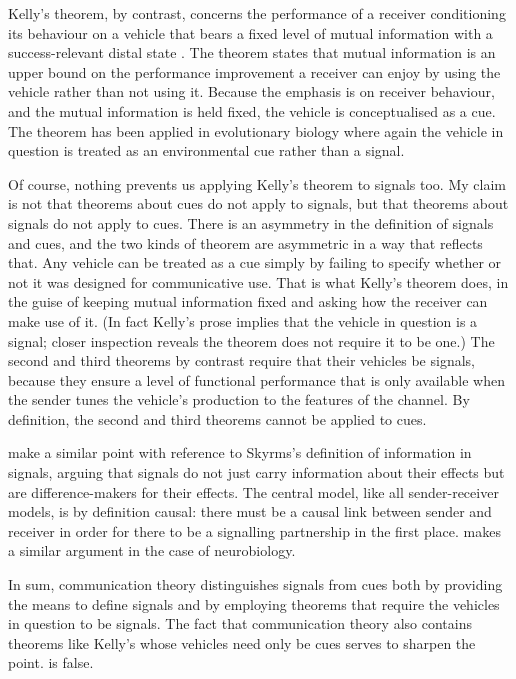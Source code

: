 \documentclass[12pt]{article}
\begin{document}
Kelly's theorem, by contrast, concerns the performance of a receiver conditioning its behaviour on a vehicle that bears a fixed level of mutual information with a success-relevant distal state \citep{kelly1956new}.
The theorem states that mutual information is an upper bound on the performance improvement a receiver can enjoy by using the vehicle rather than not using it.
Because the emphasis is on receiver behaviour, and the mutual information is held fixed, the vehicle is conceptualised as a cue.
The theorem has been applied in evolutionary biology \citep{donaldson-matasci2010fitness} where again the vehicle in question is treated as an environmental cue rather than a signal.

Of course, nothing prevents us applying Kelly's theorem to signals too.
My claim is not that theorems about cues do not apply to signals, but that theorems about signals do not apply to cues.
There is an asymmetry in the definition of signals and cues, and the two kinds of theorem are asymmetric in a way that reflects that.
Any vehicle can be treated as a cue simply by failing to specify whether or not it was designed for communicative use.
That is what Kelly's theorem does, in the guise of keeping mutual information fixed and asking how the receiver can make use of it.
(In fact Kelly's prose implies that the vehicle in question is a signal; closer inspection reveals the theorem does not require it to be one.)
The second and third theorems by contrast require that their vehicles be signals, because they ensure a level of functional performance that is only available when the sender tunes the vehicle's production to the features of the channel.
By definition, the second and third theorems cannot be applied to cues.

\citet{calcott2020signals} make a similar point with reference to Skyrms's \citeyearpar{skyrms2010signals} definition of information in signals, arguing that signals do not just carry information about their effects but are difference-makers for their effects.
The central model, like all sender-receiver models, is by definition causal: there must be a causal link between sender and receiver in order for there to be a signalling partnership in the first place.
\citet{rathkopf2017neural} makes a similar argument in the case of neurobiology.

In sum, communication theory distinguishes signals from cues both by providing the means to define signals and by employing theorems that require the vehicles in question to be signals.
The fact that communication theory also contains theorems like Kelly's whose vehicles need only be cues serves to sharpen the point.
\act{} is false.
\end{document}
